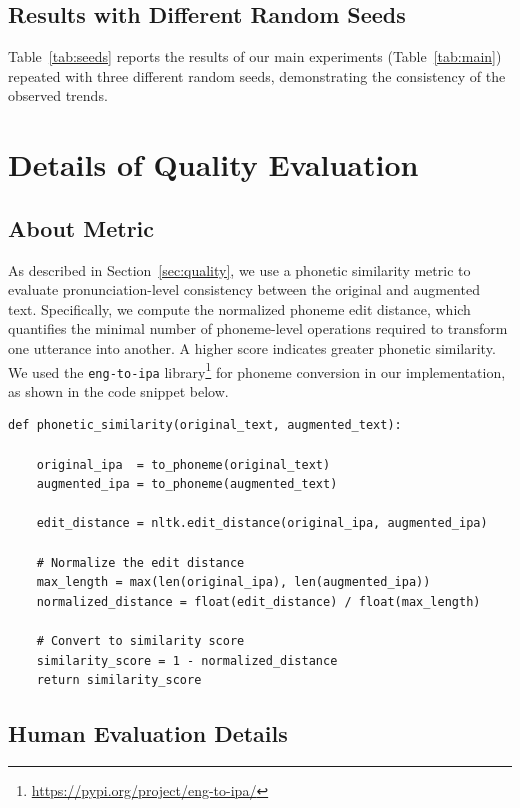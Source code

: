 \subsection{Results with Different Random Seeds}


Table~\ref{tab:seeds} reports the results of our main experiments (Table~\ref{tab:main}) repeated with three different random seeds, demonstrating the consistency of the observed trends.







\section{Details of Quality Evaluation}
\label{app:quality}
\subsection{About Metric}

As described in Section~\ref{sec:quality}, we use a phonetic similarity metric to evaluate pronunciation-level consistency between the original and augmented text. Specifically, we compute the normalized phoneme edit distance, which quantifies the minimal number of phoneme-level operations required to transform one utterance into another. A higher score indicates greater phonetic similarity.
We used the \texttt{eng-to-ipa} library\footnote{\url{https://pypi.org/project/eng-to-ipa/}} for phoneme conversion in our implementation, as shown in the code snippet below.

\begin{lstlisting}[style=pythonstyle]
def phonetic_similarity(original_text, augmented_text):
    
    original_ipa  = to_phoneme(original_text)
    augmented_ipa = to_phoneme(augmented_text)
    
    edit_distance = nltk.edit_distance(original_ipa, augmented_ipa)
    
    # Normalize the edit distance
    max_length = max(len(original_ipa), len(augmented_ipa))
    normalized_distance = float(edit_distance) / float(max_length)
    
    # Convert to similarity score
    similarity_score = 1 - normalized_distance
    return similarity_score
\end{lstlisting}


\subsection{Human Evaluation Details}

